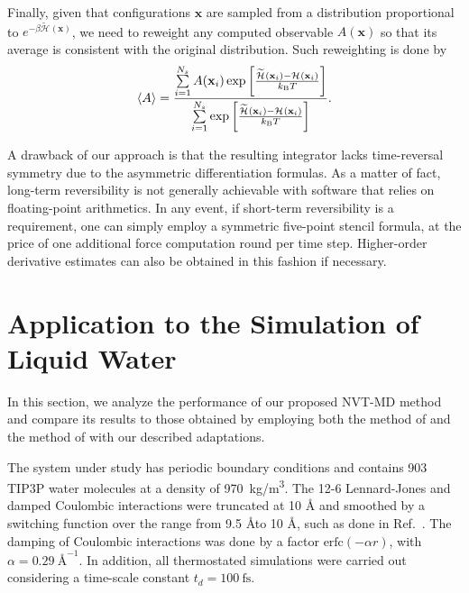 \documentclass[
journal=jctcce,
layout=twocolumn
]{achemso}
\newcommand{\vt}[1]{\boldsymbol{\mathbf{#1}}}   %
\newcommand{\Ham}[1]{{\mathcal H}_\text{#1}}    %
\newcommand{\refined}[1]{\widetilde{#1}}
\begin{document}
Finally, given that configurations $\vt x$ are sampled from a distribution proportional to $e^{-\beta \refined{\Ham{}}(\vt x)}$, we need to reweight any computed observable $A(\vt x)$ so that its average is consistent with the original distribution.
Such reweighting is done by \cite{Torrie_1977}
\begin{equation}
\label{eq:reweighting}
\langle A \rangle = \frac{\sum\limits_{i=1}^{N_s} A(\vt x_i) \exp \left[{\frac{\refined{\Ham{}}(\vt x_i) - {\Ham{}}(\vt x_i)}{k_\text{\tiny B} T}}\right]}{\sum\limits_{i=1}^{N_s} \exp \left[{\frac{\refined{\Ham{}}(\vt x_i) - {\Ham{}}(\vt x_i)}{k_\text{\tiny B} T}}\right] }.
\end{equation}

A drawback of our approach is that the resulting integrator lacks time-reversal symmetry due to the asymmetric differentiation formulas.
As a matter of fact, long-term reversibility is not generally achievable with software that relies on floating-point arithmetics.
In any event, if short-term reversibility is a requirement, one can simply employ a symmetric five-point stencil formula, at the price of one additional force computation round per time step.
Higher-order derivative estimates can also be obtained in this fashion if necessary.

\section{Application to the Simulation of Liquid Water}
\label{sec:numerical_results}

In this section, we analyze the performance of our proposed NVT-MD method and compare its results to those obtained by employing both the method of \citeauthor{Kamberaj_2005} \cite{Kamberaj_2005} and the method of \citeauthor{Martyna_1996} \cite{Martyna_1996} with our described adaptations.

The system under study has periodic boundary conditions and contains 903 TIP3P \cite{Jorgensen_1983} water molecules at a density of 970~kg/m\textsuperscript{3}.
The 12-6 Lennard-Jones and damped Coulombic interactions were truncated at 10 {\AA} and smoothed by a switching function over the range from 9.5 \AA to 10 \AA, such as done in Ref.~. 
The damping of Coulombic interactions was done by a factor $\text{erfc}(-\alpha r)$, with $\alpha = 0.29~\text{\AA}^{-1}$.
In addition, all thermostated simulations were carried out considering a time-scale constant $t_d = 100~\text{fs}$.
\end{document}
